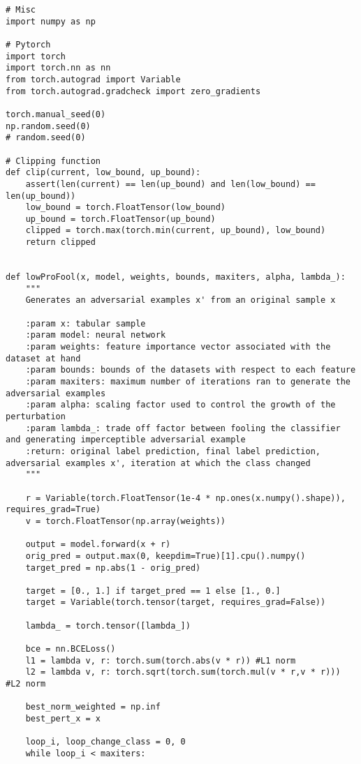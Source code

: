 \begin{lstlisting}[style=python, caption=LowProFool関数などが記載されているAdverse.py]
# Misc
import numpy as np

# Pytorch
import torch
import torch.nn as nn
from torch.autograd import Variable
from torch.autograd.gradcheck import zero_gradients

torch.manual_seed(0)
np.random.seed(0)
# random.seed(0)

# Clipping function
def clip(current, low_bound, up_bound):
    assert(len(current) == len(up_bound) and len(low_bound) == len(up_bound))
    low_bound = torch.FloatTensor(low_bound)
    up_bound = torch.FloatTensor(up_bound)
    clipped = torch.max(torch.min(current, up_bound), low_bound)
    return clipped


def lowProFool(x, model, weights, bounds, maxiters, alpha, lambda_):
    """
    Generates an adversarial examples x' from an original sample x

    :param x: tabular sample
    :param model: neural network
    :param weights: feature importance vector associated with the dataset at hand
    :param bounds: bounds of the datasets with respect to each feature
    :param maxiters: maximum number of iterations ran to generate the adversarial examples
    :param alpha: scaling factor used to control the growth of the perturbation
    :param lambda_: trade off factor between fooling the classifier and generating imperceptible adversarial example
    :return: original label prediction, final label prediction, adversarial examples x', iteration at which the class changed
    """

    r = Variable(torch.FloatTensor(1e-4 * np.ones(x.numpy().shape)), requires_grad=True) 
    v = torch.FloatTensor(np.array(weights))
    
    output = model.forward(x + r)
    orig_pred = output.max(0, keepdim=True)[1].cpu().numpy()
    target_pred = np.abs(1 - orig_pred)
    
    target = [0., 1.] if target_pred == 1 else [1., 0.]
    target = Variable(torch.tensor(target, requires_grad=False)) 
    
    lambda_ = torch.tensor([lambda_])
    
    bce = nn.BCELoss()
    l1 = lambda v, r: torch.sum(torch.abs(v * r)) #L1 norm
    l2 = lambda v, r: torch.sqrt(torch.sum(torch.mul(v * r,v * r))) #L2 norm
    
    best_norm_weighted = np.inf
    best_pert_x = x
    
    loop_i, loop_change_class = 0, 0
    while loop_i < maxiters:
            

\end{lstlisting}
